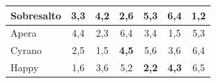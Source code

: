 \begin{enumerate}[label=(\alph*)]
\begin{table}
\begin{tabular}{|l|c|c|c|c|c|c|}
            Sobresalto & 3,3       & 4,2       & 2,6      & 5,3      & 6,4        & {\bf1,2}  \\ \hline
            Apera      & 4,4       & 2,3       & 6,4      & 3,4      & 1,5        & 5,3       \\ \hline
            Cyrano     & 2,5       & 1,5       & {\bf4,5} & 5,6      & 3,6        & 6,4       \\ \hline
            Happy      & 1,6       & 3,6       & 5,2      & {\bf2,2} & {\bf4,3}   & 6,5       \\ \hline
            \end{tabular}
        \end{table}
    \end{enumerate}







